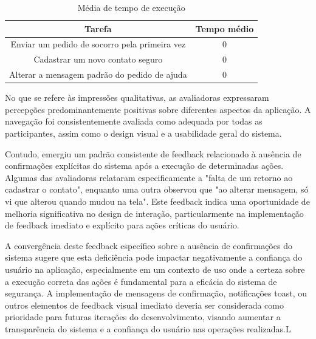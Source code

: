 \begin{table}[htbp]
	\centering
	\caption[Média de tempo de execução]{Média de tempo de execução}
	\label{tab:mediadetempo}
	\begin{tabular}{cc}
		\hline
		\multicolumn{1}{|c|}{Tarefa}                                        & \multicolumn{1}{c|}{Tempo médio}            \\ \hline \hline
		\multicolumn{1}{|c|}{Enviar um pedido de socorro pela primeira vez} & \multicolumn{1}{c|}{0} \\ \hline
		\multicolumn{1}{|c|}{Cadastrar um novo contato seguro}              & \multicolumn{1}{c|}{0} \\ \hline
		\multicolumn{1}{|c|}{Alterar a mensagem padrão do pedido de ajuda}  & \multicolumn{1}{c|}{0} \\ \hline
	\end{tabular}
\end{table}


No que se refere às impressões qualitativas, as avaliadoras expressaram percepções predominantemente positivas sobre diferentes aspectos da aplicação. A navegação foi consistentemente avaliada como adequada por todas as participantes, assim como o design visual e a usabilidade geral do sistema.

Contudo, emergiu um padrão consistente de feedback relacionado à ausência de confirmações explícitas do sistema após a execução de determinadas ações. Algumas das avaliadoras relataram especificamente a "falta de um retorno ao cadastrar o contato", enquanto uma outra observou que "ao alterar mensagem, só vi que alterou quando mudou na tela". Este feedback indica uma oportunidade de melhoria significativa no design de interação, particularmente na implementação de feedback imediato e explícito para ações críticas do usuário.

A convergência deste feedback específico sobre a ausência de confirmações do sistema sugere que esta deficiência pode impactar negativamente a confiança do usuário na aplicação, especialmente em um contexto de uso onde a certeza sobre a execução correta das ações é fundamental para a eficácia do sistema de segurança. A implementação de mensagens de confirmação, notificações toast, ou outros elementos de feedback visual imediato deveria ser considerada como prioridade para futuras iterações do desenvolvimento, visando aumentar a transparência do sistema e a confiança do usuário nas operações realizadas.L